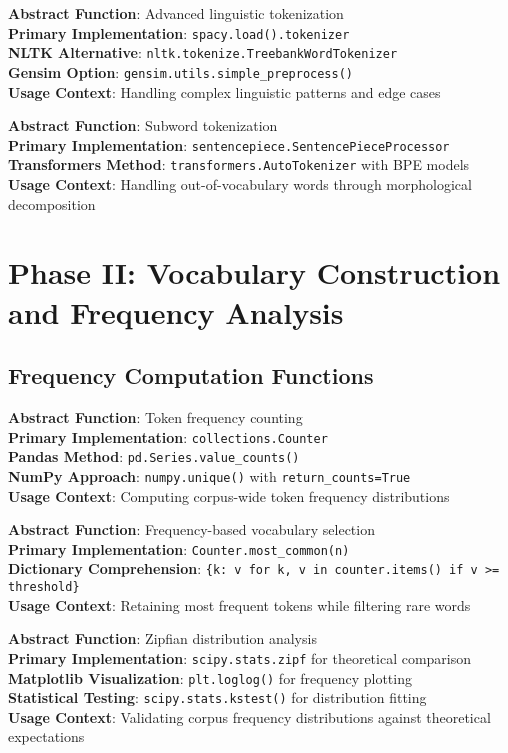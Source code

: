 \documentclass[11pt,a4paper]{article}
\begin{document}
\textbf{Abstract Function}: Advanced linguistic tokenization \\
\textbf{Primary Implementation}: \texttt{spacy.load().tokenizer} \\
\textbf{NLTK Alternative}: \texttt{nltk.tokenize.TreebankWordTokenizer} \\
\textbf{Gensim Option}: \texttt{gensim.utils.simple\_preprocess()} \\
\textbf{Usage Context}: Handling complex linguistic patterns and edge cases

\textbf{Abstract Function}: Subword tokenization \\
\textbf{Primary Implementation}: \texttt{sentencepiece.SentencePieceProcessor} \\
\textbf{Transformers Method}: \texttt{transformers.AutoTokenizer} with BPE models \\
\textbf{Usage Context}: Handling out-of-vocabulary words through morphological decomposition

\section{Phase II: Vocabulary Construction and Frequency Analysis}

\subsection{Frequency Computation Functions}

\textbf{Abstract Function}: Token frequency counting \\
\textbf{Primary Implementation}: \texttt{collections.Counter} \\
\textbf{Pandas Method}: \texttt{pd.Series.value\_counts()} \\
\textbf{NumPy Approach}: \texttt{numpy.unique()} with \texttt{return\_counts=True} \\
\textbf{Usage Context}: Computing corpus-wide token frequency distributions

\textbf{Abstract Function}: Frequency-based vocabulary selection \\
\textbf{Primary Implementation}: \texttt{Counter.most\_common(n)} \\
\textbf{Dictionary Comprehension}: \texttt{\{k: v for k, v in counter.items() if v >= threshold\}} \\
\textbf{Usage Context}: Retaining most frequent tokens while filtering rare words

\textbf{Abstract Function}: Zipfian distribution analysis \\
\textbf{Primary Implementation}: \texttt{scipy.stats.zipf} for theoretical comparison \\
\textbf{Matplotlib Visualization}: \texttt{plt.loglog()} for frequency plotting \\
\textbf{Statistical Testing}: \texttt{scipy.stats.kstest()} for distribution fitting \\
\textbf{Usage Context}: Validating corpus frequency distributions against theoretical expectations
\end{document}
